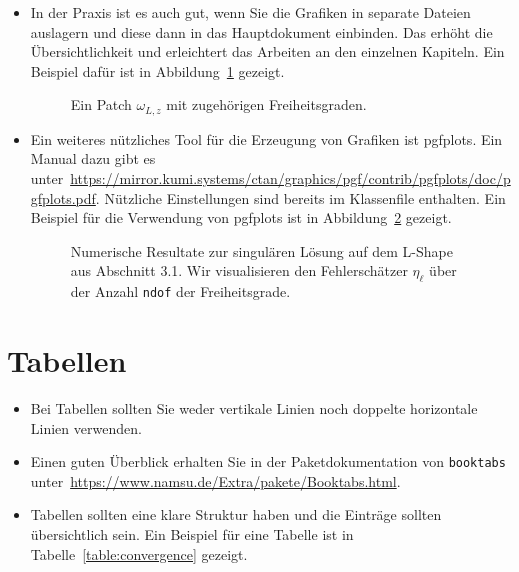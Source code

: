 \begin{itemize}
  \item In der Praxis ist es auch gut, wenn Sie die Grafiken in separate Dateien auslagern und diese dann in das Hauptdokument einbinden. Das erhöht die Übersichtlichkeit und erleichtert das Arbeiten an den einzelnen Kapiteln. Ein Beispiel dafür ist in Abbildung~\ref{fig:patch} gezeigt.
        \begin{figure}
          \centering
          \begin{tikzpicture}
            
          \end{tikzpicture}
          \caption{Ein Patch $\omega_{L,z}$ mit zugehörigen Freiheitsgraden.}
          \label{fig:patch}
        \end{figure}

  \item Ein weiteres nützliches Tool für die Erzeugung von Grafiken ist pgfplots. Ein Manual dazu gibt es unter~\url{https://mirror.kumi.systems/ctan/graphics/pgf/contrib/pgfplots/doc/pgfplots.pdf}. Nützliche Einstellungen sind bereits im Klassenfile enthalten. Ein Beispiel für die Verwendung von pgfplots ist in Abbildung~\ref{fig:konvergenzplot} gezeigt.

        \begin{figure}
          \centering
          
          \caption{Numerische Resultate zur singulären Lösung auf dem
            L-Shape aus Abschnitt 3.1. Wir visualisieren den Fehlerschätzer $\eta_\ell$ über der
            Anzahl \texttt{ndof} der Freiheitsgrade.
          }
          \label{fig:konvergenzplot}
        \end{figure}
\end{itemize}

\section{Tabellen}
\begin{itemize}
  \item Bei Tabellen sollten Sie weder vertikale Linien noch doppelte horizontale Linien verwenden.
  \item Einen guten Überblick erhalten Sie in der Paketdokumentation von \verb$booktabs$ unter~\url{https://www.namsu.de/Extra/pakete/Booktabs.html}.
  \item Tabellen sollten eine klare Struktur haben und die Einträge sollten übersichtlich sein. Ein Beispiel für eine Tabelle ist in Tabelle~\ref{table:convergence} gezeigt.
  
  \begin{table}
    \centering
    
    \caption{Experimentelle Konvergenzraten des Fehlerschätzers aus Abschnitt~3.1.}
    \label{table:convergence}
  \end{table}
\end{itemize}

